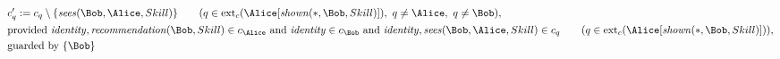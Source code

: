 \begin{align*}
&
c'_
q
 := 
c_
q
 \setminus 
\{
\mathit{\detokenize{
sees
}}
(
\Bob
,
\Alice
,
Skill
)
\}
 \qquad (
q
 \in 
\mathrm{ext}_c(
\Alice
[
\mathit{\detokenize{
shown
}}
(
\ast
,
\Bob
,
Skill
)
]
)
,\ 
q \neq 
\Alice
,\ 
q \neq 
\Bob
)
,\\
&
\text{provided } 
\mathit{\detokenize{
identity
}}
,
\mathit{\detokenize{
recommendation
}}
(
\Bob
,
Skill
)
 \in c_
{
\Alice
}
 \text{ and } 
\mathit{\detokenize{
identity
}}
 \in c_
{
\Bob
}
 \text{ and } 
\mathit{\detokenize{
identity
}}
,
\mathit{\detokenize{
sees
}}
(
\Bob
,
\Alice
,
Skill
)
 \in c_
q
 \qquad (
q \in 
\mathrm{ext}_c(
\Alice
[
\mathit{\detokenize{
shown
}}
(
\ast
,
\Bob
,
Skill
)
]
)
)
,\\
&
\text{guarded by } \{
\Bob
\}
\end{align*}
